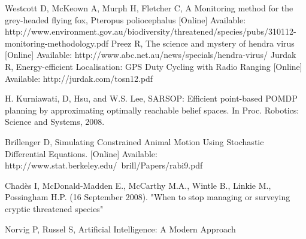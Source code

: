 \documentclass[12pt,openany,a4paper]{book}
\begin{document}
%
%
%
%
%

\begin{thebibliography}{99}
 Westcott D, McKeown A, Murph H, Fletcher C, A Monitoring method for the grey-headed flying fox, Pteropus poliocephalus [Online] Available: http://www.environment.gov.au/biodiversity/threatened/species/pubs/310112-monitoring-methodology.pdf
 Preez R, The science and mystery of hendra virus [Online] Available: http://www.abc.net.au/news/specials/hendra-virus/
 Jurdak R, Energy-efficient Localisation: GPS Duty Cycling with Radio Ranging [Online] Available: http://jurdak.com/tosn12.pdf

H. Kurniawati, D, Hsu, and W.S. Lee, SARSOP: Efficient point-based POMDP planning by approximating optimally reachable belief spaces. In Proc. Robotics: Science and Systems, 2008. 

 Brillenger D, Simulating Constrained Animal Motion Using Stochastic Differential Equations. [Online] Available: http://www.stat.berkeley.edu/~brill/Papers/rabi9.pdf

 Chadès I, McDonald-Madden E., McCarthy M.A., Wintle B., Linkie M., Possingham H.P. (16 September 2008). "When to stop managing or surveying cryptic threatened species"

 Norvig P, Russel S, Artificial Intelligence: A Modern Approach

\end{thebibliography}
\end{document}
